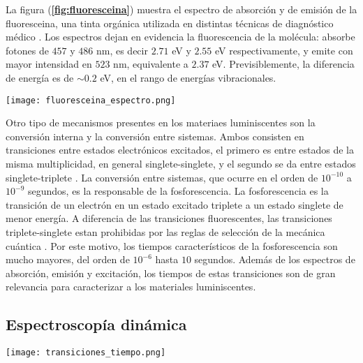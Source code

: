 \noindent La figura (\textbf{\ref{fig:fluoresceina}}) muestra el espectro de absorción y de emisión de la fluoresceina, una tinta orgánica utilizada en distintas técnicas de diagnóstico médico \cite{fluoresceina_1,fluoresceina_2}.
Los espectros dejan en evidencia la fluorescencia de la molécula: absorbe fotones de $457$ y $486$ nm, es decir $2.71$ eV y $2.55$ eV respectivamente, y emite con mayor intensidad en $523$ nm, equivalente a $2.37$ eV.
Previsiblemente, la diferencia de energía es de $\sim 0.2$ eV, en el rango de energías vibracionales.


\begin{SCfigure}
    \centering
    \texttt{[image: fluoresceina\_espectro.png]}
    \caption{\textbf{Espectro de la Fluoresceina} diluida en etanol, tanto de absorción (azul) como de emisión (rojo). El cuadro muestra los picos de absorción en $\lambda_{abs}=457$ nm y 486 nm, y de emisión en $\lambda_{em}$ = 523 nm. Tomada y adaptada de \cite{kristoffersen_testing_2018}.}
    \label{fig:fluoresceina}
\end{SCfigure}

Otro tipo de mecanismos presentes en los materiaes luminiscentes son la conversión interna y la conversión entre sistemas.
Ambos consisten en transiciones entre estados electrónicos excitados, el primero es entre estados de la misma multiplicidad, en general singlete-singlete, y el segundo se da entre estados singlete-triplete \cite{valeur_characteristics_2012}.
La conversión entre sistemas, que ocurre en el orden de $10^{-10}$ a $10^{-9}$ segundos, es la responsable de la fosforescencia.
La fosforescencia es la transición de un electrón en un estado excitado triplete a un estado singlete de menor energía.
A diferencia de las transiciones fluorescentes, las transiciones triplete-singlete estan prohibidas por las reglas de selección de la mecánica cuántica \cite{demtroder_emission_2010}.
Por este motivo, los tiempos característicos de la fosforescencia son mucho mayores, del orden de $10^{-6}$ hasta $10$ segundos.
Además de los espectros de absorción, emisión y excitación, los tiempos de estas transiciones son de gran relevancia para caracterizar a los materiales luminiscentes.

\subsection{Espectroscopía dinámica} \label{sec:dinamica}

\begin{SCfigure}
    \centering
    \texttt{[image: transiciones\_tiempo.png]}
    \caption{\textbf{Diagrama de Jablonski} con transiciones que contribuyen al tiempo de vida.\textbf{(A)} Sólo transiciones de fluorescencia. \textbf{(B)} Transiciones de fluorescencia y choques. Tomado y adaptado de \cite{demtroder_emission_2010}.}
    \label{fig:transiciones_tiempo}
\end{SCfigure}


